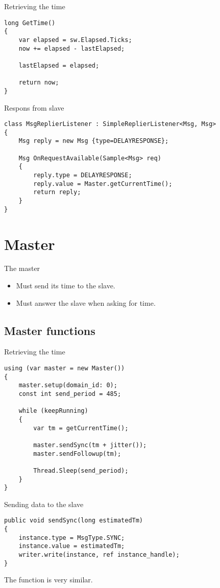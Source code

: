 \documentclass[compressed, presentation, notheorems, 12pt]{beamer}
\begin{document}
	\begin{frame}[containsverbatim]{Retrieving the time}
	\begin{lstlisting}[style=Code-C++]
long GetTime()
{
	var elapsed = sw.Elapsed.Ticks;
	now += elapsed - lastElapsed;

	lastElapsed = elapsed;

	return now;
}
	\end{lstlisting}
	\end{frame}



	\begin{frame}[containsverbatim]{Respons from slave}
	\begin{lstlisting}[style=Code-C++]
class MsgReplierListener : SimpleReplierListener<Msg, Msg>
{
	Msg reply = new Msg {type=DELAYRESPONSE};

	Msg OnRequestAvailable(Sample<Msg> req)
	{
		reply.type = DELAYRESPONSE;
		reply.value = Master.getCurrentTime();
		return reply;
	}
}
	\end{lstlisting}

	\end{frame}




\section{Master}

	\begin{frame}{The master}
	\begin{itemize}
		\item Must send its time to the slave.
		\item Must answer the slave when asking for time.
	\end{itemize}
	\end{frame}


\subsection{Master functions}
	\begin{frame}[containsverbatim]{Retrieving the time}
	\begin{lstlisting}[style=Code-C++]
using (var master = new Master())
{
	master.setup(domain_id: 0);
	const int send_period = 485; 

	while (keepRunning)
	{
		var tm = getCurrentTime();

		master.sendSync(tm + jitter());
		master.sendFollowup(tm);						

		Thread.Sleep(send_period);
	}
}
	\end{lstlisting}
	\end{frame}

 	

	\begin{frame}[containsverbatim]{Sending data to the slave}
	\begin{lstlisting}[style=Code-C++]
public void sendSync(long estimatedTm)
{
	instance.type = MsgType.SYNC;
	instance.value = estimatedTm;
	writer.write(instance, ref instance_handle);
}
	\end{lstlisting}

	The function  is very similar.
	\end{frame}
\end{document}
